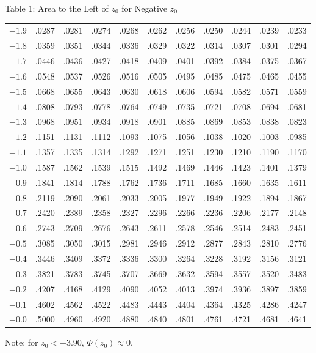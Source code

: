 \documentclass[11pt]{article}
\begin{document}
\begin{distbox}{Table 1: Area to the Left of $z_0$ for Negative $z_0$}
\begin{tabular}{c|cccccccccc}
$-1.9$ & .0287 & .0281 & .0274 & .0268 & .0262 & .0256 & .0250 & .0244 & .0239 & .0233 \\
$-1.8$ & .0359 & .0351 & .0344 & .0336 & .0329 & .0322 & .0314 & .0307 & .0301 & .0294 \\
$-1.7$ & .0446 & .0436 & .0427 & .0418 & .0409 & .0401 & .0392 & .0384 & .0375 & .0367 \\
$-1.6$ & .0548 & .0537 & .0526 & .0516 & .0505 & .0495 & .0485 & .0475 & .0465 & .0455 \\
$-1.5$ & .0668 & .0655 & .0643 & .0630 & .0618 & .0606 & .0594 & .0582 & .0571 & .0559 \\
$-1.4$ & .0808 & .0793 & .0778 & .0764 & .0749 & .0735 & .0721 & .0708 & .0694 & .0681 \\
$-1.3$ & .0968 & .0951 & .0934 & .0918 & .0901 & .0885 & .0869 & .0853 & .0838 & .0823 \\
$-1.2$ & .1151 & .1131 & .1112 & .1093 & .1075 & .1056 & .1038 & .1020 & .1003 & .0985 \\
$-1.1$ & .1357 & .1335 & .1314 & .1292 & .1271 & .1251 & .1230 & .1210 & .1190 & .1170 \\
$-1.0$ & .1587 & .1562 & .1539 & .1515 & .1492 & .1469 & .1446 & .1423 & .1401 & .1379 \\
$-0.9$ & .1841 & .1814 & .1788 & .1762 & .1736 & .1711 & .1685 & .1660 & .1635 & .1611 \\
$-0.8$ & .2119 & .2090 & .2061 & .2033 & .2005 & .1977 & .1949 & .1922 & .1894 & .1867 \\
$-0.7$ & .2420 & .2389 & .2358 & .2327 & .2296 & .2266 & .2236 & .2206 & .2177 & .2148 \\
$-0.6$ & .2743 & .2709 & .2676 & .2643 & .2611 & .2578 & .2546 & .2514 & .2483 & .2451 \\
$-0.5$ & .3085 & .3050 & .3015 & .2981 & .2946 & .2912 & .2877 & .2843 & .2810 & .2776 \\
$-0.4$ & .3446 & .3409 & .3372 & .3336 & .3300 & .3264 & .3228 & .3192 & .3156 & .3121 \\
$-0.3$ & .3821 & .3783 & .3745 & .3707 & .3669 & .3632 & .3594 & .3557 & .3520 & .3483 \\
$-0.2$ & .4207 & .4168 & .4129 & .4090 & .4052 & .4013 & .3974 & .3936 & .3897 & .3859 \\
$-0.1$ & .4602 & .4562 & .4522 & .4483 & .4443 & .4404 & .4364 & .4325 & .4286 & .4247 \\
$-0.0$ & .5000 & .4960 & .4920 & .4880 & .4840 & .4801 & .4761 & .4721 & .4681 & .4641 \\
\bottomrule
\end{tabular}

{\footnotesize Note: for $z_0<-3.90$, $\Phi(z_0)\approx 0$.}

\end{distbox}
\end{document}

